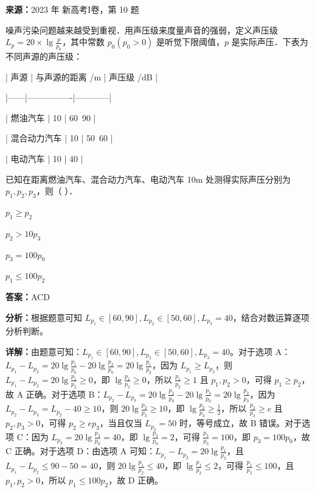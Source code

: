 \begin{question}[points=5]
\textbf{来源：}2023 年 新高考I卷，第 10 题\par
噪声污染问题越来越受到重视．用声压级来度量声音的强弱，定义声压级 $L_p=20\times\lg\frac{p}{p_0}$，其中常数 $p_0(p_0>0)$ 是听觉下限阈值，$p$ 是实际声压．下表为不同声源的声压级：



| 声源 | 与声源的距离 /m | 声压级 /dB |

|------|----------------|------------|

| 燃油汽车 | 10 | 60~90 |

| 混合动力汽车 | 10 | 50~60 |

| 电动汽车 | 10 | 40 |



已知在距离燃油汽车、混合动力汽车、电动汽车 10m 处测得实际声压分别为 $p_1, p_2, p_3$，则（ ）．
\begin{choices}
  \item $p_1\geq p_2$
  \item $p_2>10p_3$
  \item $p_3=100p_0$
  \item $p_1\leq 100p_2$
\end{choices}
\begin{solution}
\textbf{答案：}ACD

\textbf{分析：}根据题意可知 $L_{p_1}\in[60,90], L_{p_2}\in[50,60], L_{p_3}=40$，结合对数运算逐项分析判断。

\textbf{详解：}由题意可知：$L_{p_1}\in[60,90], L_{p_2}\in[50,60], L_{p_3}=40$。对于选项 A：$L_{p_1}-L_{p_2}=20\lg\frac{p_1}{p_0}-20\lg\frac{p_2}{p_0}=20\lg\frac{p_1}{p_2}$，因为 $L_{p_1}\geq L_{p_2}$，则 $L_{p_1}-L_{p_2}=20\lg\frac{p_1}{p_2}\geq 0$，即 $\lg\frac{p_1}{p_2}\geq 0$，所以 $\frac{p_1}{p_2}\geq 1$ 且 $p_1,p_2>0$，可得 $p_1\geq p_2$，故 A 正确。对于选项 B：$L_{p_2}-L_{p_3}=20\lg\frac{p_2}{p_0}-20\lg\frac{p_3}{p_0}=20\lg\frac{p_2}{p_3}$，因为 $L_{p_2}-L_{p_3}=L_{p_2}-40\geq 10$，则 $20\lg\frac{p_2}{p_3}\geq 10$，即 $\lg\frac{p_2}{p_3}\geq \frac{1}{2}$，所以 $\frac{p_2}{p_3}\geq e$ 且 $p_2,p_3>0$，可得 $p_2\geq e p_3$，当且仅当 $L_{p_2}=50$ 时，等号成立，故 B 错误。对于选项 C：因为 $L_{p_3}=20\lg\frac{p_3}{p_0}=40$，即 $\lg\frac{p_3}{p_0}=2$，可得 $\frac{p_3}{p_0}=100$，即 $p_3=100p_0$，故 C 正确。对于选项 D：由选项 A 可知：$L_{p_1}-L_{p_2}=20\lg\frac{p_1}{p_2}$，且 $L_{p_1}-L_{p_2}\leq 90-50=40$，则 $20\lg\frac{p_1}{p_2}\leq 40$，即 $\lg\frac{p_1}{p_2}\leq 2$，可得 $\frac{p_1}{p_2}\leq 100$，且 $p_1,p_2>0$，所以 $p_1\leq 100p_2$，故 D 正确。
\end{solution}
\end{question}

